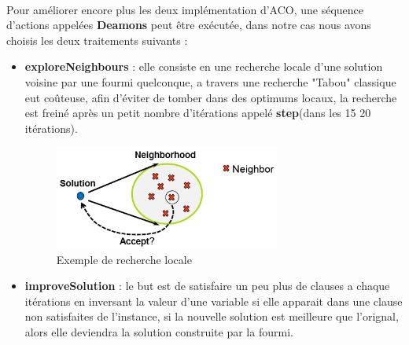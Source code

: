 	\paragraph{}
	Pour améliorer encore plus les deux implémentation d'ACO, une séquence d'actions appelées \textbf{Deamons} peut être exécutée, dans notre cas nous avons choisis les deux traitements suivants : 
	\begin{itemize}
		\item \textbf{exploreNeighbours} : elle consiste en une recherche locale d'une solution voisine par une fourmi quelconque, a travers une recherche "Tabou" classique eut coûteuse, afin d'éviter de tomber dans des optimums locaux, la recherche est freiné après un petit nombre d'itérations appelé \textbf{step}(dans les 15 20 itérations).
		\begin{figure}[H]
			\centering
			\includegraphics[width=0.7\textwidth]{images/localSearch.jpg}
			\caption{Exemple de recherche locale}
		\end{figure}
		\item \textbf{improveSolution} : le but est de  satisfaire un peu plus de clauses a chaque itérations en inversant la valeur d'une variable si elle apparait dans une clause non satisfaites de l'instance, si la nouvelle solution est meilleure que l'orignal, alors elle deviendra la solution construite par la fourmi.
	\end{itemize}
